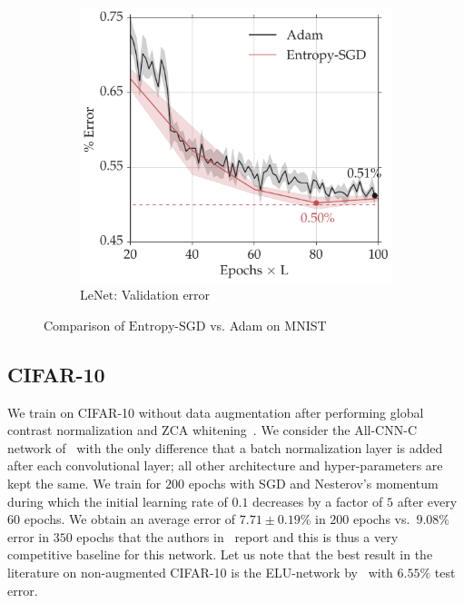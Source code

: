 \documentclass[10pt]{article}
\newcommand{\entropysgd}{\mathrm{Entropy}\textrm{-}\mathrm{SGD}}
\newcommand{\lenet}{\textrm{LeNet}}
\begin{document}
\begin{figure}[htp!]
\begin{subfigure}[t]{0.45\textwidth}
        \includegraphics[width=\textwidth]{lenet_valid.pdf}
        \caption{\small $\lenet$: Validation error}
        \label{fig:lenet_test}
    \end{subfigure}
\caption{\small Comparison of $\entropysgd$ vs. Adam on MNIST\vspace*{0.15in}}
\label{fig:mnist_test}
\end{figure}

\subsection{CIFAR-10}
\label{ss:expt:cifar}

We train on CIFAR-10 without data augmentation after performing global contrast normalization and ZCA whitening~\citep{goodfellow2013maxout}. We consider the All-CNN-C network of~\citet{springenberg2014striving} with the only difference that a batch normalization layer is added after each convolutional layer; all other architecture and hyper-parameters are kept the same. We train for $200$ epochs with SGD and Nesterov's momentum during which the initial learning rate of $0.1$ decreases by a factor of $5$ after every $60$ epochs. We obtain an average error of $7.71 \pm 0.19\%$ in $200$ epochs vs.\ $9.08\%$ error in $350$ epochs that the authors in~\citet{springenberg2014striving} report and this is thus a very competitive baseline for this network. Let us note that the best result in the literature on non-augmented CIFAR-10 is the ELU-network by~\citet{clevert2015fast} with $6.55\%$ test error.
\end{document}
